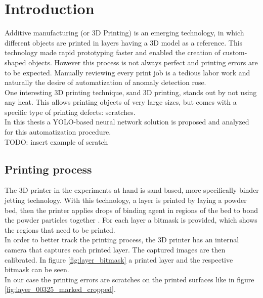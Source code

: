 \section{Introduction}



Additive manufacturing (or 3D Printing) is an emerging technology, in which
different objects are printed in layers having a 3D model as a reference. This technology made rapid prototyping faster and enabled the creation of custom-shaped objects. However this process is not always perfect and printing errors are to be expected. Manually reviewing every print job is a tedious labor work and naturally the desire of automatization of anomaly detection rose. \\
One interesting 3D printing technique, sand 3D printing, stands out by not using any heat. This allows printing objects of very large sizes, but comes with a specific type of printing defects: scratches. \\
In this thesis a YOLO-based neural network solution is proposed and analyzed for this automatization procedure. \\

TODO: insert example of scratch


\subsection{Printing process}
The 3D printer in the experiments at hand is sand based, more specifically binder jetting technology. With this technology, a layer is printed by laying a powder bed, then the printer applies drops of binding agent in regions of the bed to bond the powder particles together \cite{binder_jetting}. For each layer a bitmask is provided, which shows the regions that need to be printed. \\
In order to better track the printing process, the 3D printer has an internal camera that captures each printed layer. The captured images are then calibrated. In figure \ref{fig:layer_bitmask} a printed layer and the respective bitmask can be seen.\\
In our case the printing errors are scratches on the printed surfaces like in figure \ref{fig:layer_00325_marked_cropped}.


